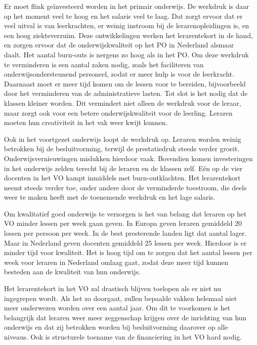 Er moet flink geïnvesteerd worden in het primair onderwijs. De werkdruk
is daar op het moment veel te hoog en het salaris veel te laag. Dat
zorgt ervoor dat er veel uitval is van leerkrachten, er weinig instroom
bij de lerarenopleidingen is, en een hoog ziekteverzuim. Deze
ontwikkelingen werken het lerarentekort in de hand, en zorgen ervoor dat
de onderwijskwaliteit op het PO in Nederland alsmaar daalt. Het aantal
burn-outs is nergens zo hoog als in het PO. Om deze werkdruk te
verminderen is een aantal zaken nodig, zoals het faciliteren van
onderwijsondersteunend personeel, zodat er meer hulp is voor de
leerkracht. Daarnaast moet er meer tijd komen om de lessen voor te
bereiden, bijvoorbeeld door het verminderen van de administratieve
lasten. Tot slot is het nodig dat de klassen kleiner worden. Dit
vermindert niet alleen de werkdruk voor de leraar, maar zorgt ook voor
een betere onderwijskwaliteit voor de leerling. Leraren moeten hun
creativiteit in het vak weer kwijt kunnen.

Ook in het voortgezet onderwijs loopt de werkdruk op. Leraren worden
weinig betrokken bij de besluitvorming, terwijl de prestatiedruk steeds
verder groeit. Onderwijsvernieuwingen mislukken hierdoor vaak. Bovendien
komen investeringen in het onderwijs zelden terecht bij de leraren en de
klassen zelf. Eén op de vier docenten in het VO kampt inmiddels met
burn-outklachten. Het lerarentekort neemt steeds verder toe, onder
andere door de verminderde toestroom, die deels weer te maken heeft met
de toenemende werkdruk en het lage salaris.

Om kwalitatief goed onderwijs te verzorgen is het van belang dat leraren
op het VO minder lessen per week gaan geven. In Europa geven leraren
gemiddeld 20 lessen per persoon per week. In de best presterende landen
ligt dat aantal lager. Maar in Nederland geven docenten gemiddeld 25
lessen per week. Hierdoor is er minder tijd voor kwaliteit. Het is hoog
tijd om te zorgen dat het aantal lessen per week voor leraren in
Nederland omlaag gaat, zodat deze meer tijd kunnen besteden aan de
kwaliteit van hun onderwijs.

Het lerarentekort in het VO zal drastisch blijven toelopen als er niet
nu ingegrepen wordt. Als het zo doorgaat, zullen bepaalde vakken
helemaal niet meer onderwezen worden over een aantal jaar. Om dit te
voorkomen is het belangrijk dat leraren weer meer zeggenschap krijgen
over de inrichting van hun onderwijs en dat zij betrokken worden bij
besluitvorming daarover op alle niveaus. Ook is structurele toename van
de financiering in het VO hard nodig.

